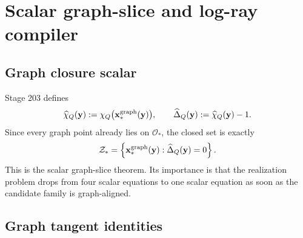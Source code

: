 \section{Scalar graph-slice and log-ray compiler}
\label{sec:part06-scalar-graph-slice-and-log-ray-compiler}

\subsection{Graph closure scalar}
\label{subsec:part06-graph-closure-scalar}

Stage 203 defines
\begin{equation}
\label{eq:part06-chi-hat-def}
\widehat\chi_Q(\mathbf y):=
\chi_Q\bigl(\mathbf x_*^{\rm graph}(\mathbf y)\bigr),
\qquad
\widehat\Delta_Q(\mathbf y):=\widehat\chi_Q(\mathbf y)-1.
\end{equation}
Since every graph point already lies on \(\mathcal O_*\), the closed set is exactly
\begin{equation}
\label{eq:part06-Zstar-graph-slice}
\mathcal Z_*
=
\left\{
\mathbf x_*^{\rm graph}(\mathbf y):\widehat\Delta_Q(\mathbf y)=0
\right\}.
\end{equation}
This is the scalar graph-slice theorem.  Its importance is that the realization problem drops from four scalar equations to one scalar equation as soon as the candidate family is graph-aligned.

\subsection{Graph tangent identities}
\label{subsec:part06-graph-tangent-identities}

